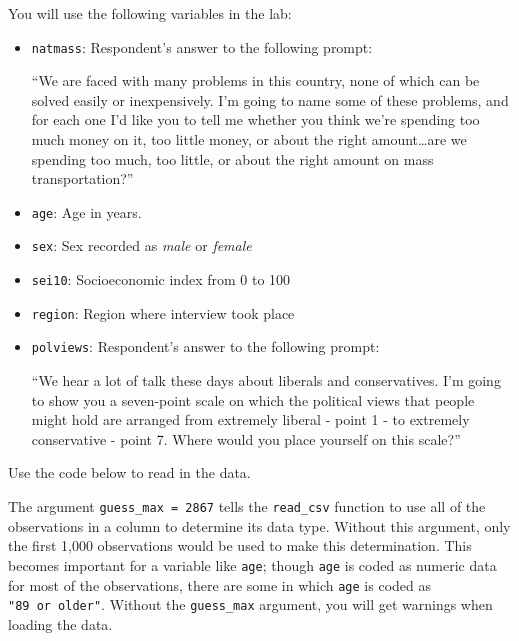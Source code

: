 \documentclass[]{book}
\newenvironment{Shaded}{\begin{snugshade}}{\end{snugshade}}
\newcommand{\KeywordTok}[1]{\textcolor[rgb]{0.13,0.29,0.53}{\textbf{#1}}}
\newcommand{\DataTypeTok}[1]{\textcolor[rgb]{0.13,0.29,0.53}{#1}}
\newcommand{\DecValTok}[1]{\textcolor[rgb]{0.00,0.00,0.81}{#1}}
\newcommand{\StringTok}[1]{\textcolor[rgb]{0.31,0.60,0.02}{#1}}
\newcommand{\OperatorTok}[1]{\textcolor[rgb]{0.81,0.36,0.00}{\textbf{#1}}}
\newcommand{\NormalTok}[1]{#1}
\begin{document}
You will use the following variables in the lab:

\begin{itemize}
\item
  \texttt{natmass}: Respondent's answer to the following prompt:

  ``We are faced with many problems in this country, none of which can
  be solved easily or inexpensively. I'm going to name some of these
  problems, and for each one I'd like you to tell me whether you think
  we're spending too much money on it, too little money, or about the
  right amount\ldots{}are we spending too much, too little, or about the
  right amount on mass transportation?''
\item
  \texttt{age}: Age in years.
\item
  \texttt{sex}: Sex recorded as \emph{male} or \emph{female}
\item
  \texttt{sei10}: Socioeconomic index from 0 to 100
\item
  \texttt{region}: Region where interview took place
\item
  \texttt{polviews}: Respondent's answer to the following prompt:

  ``We hear a lot of talk these days about liberals and conservatives.
  I'm going to show you a seven-point scale on which the political views
  that people might hold are arranged from extremely liberal - point 1 -
  to extremely conservative - point 7. Where would you place yourself on
  this scale?''
\end{itemize}

Use the code below to read in the data.

\begin{Shaded}
\end{Shaded}

The argument \texttt{guess\_max\ =\ 2867} tells the \texttt{read\_csv}
function to use all of the observations in a column to determine its
data type. Without this argument, only the first 1,000 observations
would be used to make this determination. This becomes important for a
variable like \texttt{age}; though \texttt{age} is coded as numeric data
for most of the observations, there are some in which \texttt{age} is
coded as \texttt{"89\ or\ older"}. Without the \texttt{guess\_max}
argument, you will get warnings when loading the data.
\end{document}
